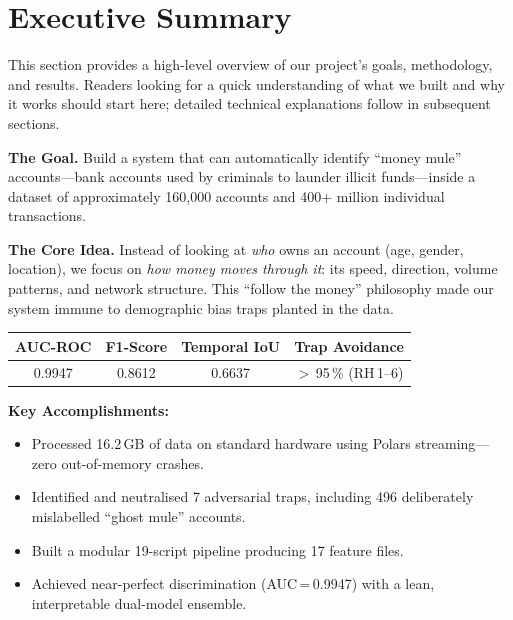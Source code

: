 \documentclass[11pt, a4paper]{article}
\begin{document}
\section{Executive Summary}

This section provides a high-level overview of our project's goals, methodology, and
results. Readers looking for a quick understanding of what we built and why it works should
start here; detailed technical explanations follow in subsequent sections.

\medskip

\textbf{The Goal.}\quad
Build a system that can automatically identify ``money mule'' accounts---bank accounts used
by criminals to launder illicit funds---inside a dataset of approximately 160,000 accounts
and 400+ million individual transactions.

\medskip

\textbf{The Core Idea.}\quad
Instead of looking at \emph{who} owns an account (age, gender, location), we focus on
\emph{how money moves through it}: its speed, direction, volume patterns, and network
structure. This ``follow the money'' philosophy made our system immune to demographic bias
traps planted in the data.

\medskip

\begin{resultbox}
\centering
\begin{tabular}{cccc}
\textbf{AUC-ROC} & \textbf{F1-Score} & \textbf{Temporal IoU} & \textbf{Trap Avoidance} \\
\midrule
0.9947 & 0.8612 & 0.6637 & $>$\,95\,\% (RH\,1--6) \\
\end{tabular}
\end{resultbox}

\textbf{Key Accomplishments:}
\begin{itemize}[leftmargin=1.5em, itemsep=2pt]
    \item Processed 16.2\,GB of data on standard hardware using Polars streaming---zero
          out-of-memory crashes.
    \item Identified and neutralised 7 adversarial traps, including 496 deliberately
          mislabelled ``ghost mule'' accounts.
    \item Built a modular 19-script pipeline producing 17 feature files.
    \item Achieved near-perfect discrimination (AUC\,=\,0.9947) with a lean, interpretable
          dual-model ensemble.
\end{itemize}
\end{document}
